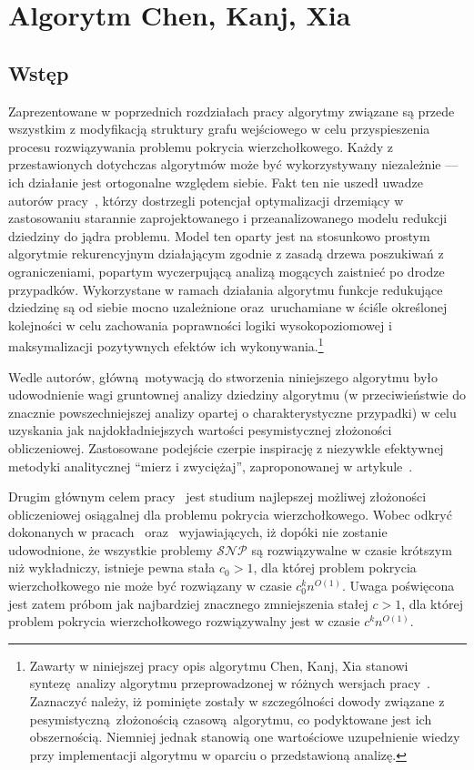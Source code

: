 \section{Algorytm Chen, Kanj, Xia}\label{s_ckx}
\subsection{Wstęp}
\par{
  Zaprezentowane w poprzednich rozdziałach pracy algorytmy związane są przede wszystkim z modyfikacją struktury grafu wejściowego w celu przyspieszenia procesu rozwiązywania problemu pokrycia wierzchołkowego.
  Każdy z przestawionych dotychczas algorytmów może być wykorzystywany niezależnie --- ich działanie jest ortogonalne względem siebie.
  Fakt ten nie uszedł uwadze autorów pracy~\cite{ImprovedBounds10}, którzy dostrzegli potencjał optymalizacji drzemiący w zastosowaniu starannie zaprojektowanego i przeanalizowanego modelu redukcji dziedziny do jądra problemu.
  Model ten oparty jest na stosunkowo prostym algorytmie rekurencyjnym działającym zgodnie z zasadą drzewa poszukiwań z ograniczeniami, popartym wyczerpującą analizą mogących zaistnieć po drodze przypadków.
  Wykorzystane w ramach działania algorytmu funkcje redukujące dziedzinę są od siebie mocno uzależnione oraz uruchamiane w ściśle określonej kolejności w celu zachowania poprawności logiki wysokopoziomowej i maksymalizacji pozytywnych efektów ich wykonywania.\footnote{Zawarty w niniejszej pracy opis algorytmu Chen, Kanj, Xia stanowi syntezę analizy algorytmu przeprowadzonej w różnych wersjach pracy~\cite{ImprovedBounds10}. Zaznaczyć należy, iż pominięte zostały w szczególności dowody związane z pesymistyczną złożonością czasową algorytmu, co podyktowane jest ich obszernością. Niemniej jednak stanowią one wartościowe uzupełnienie wiedzy przy implementacji algorytmu w oparciu o przedstawioną analizę.}
}
\par{
  Wedle autorów, główną motywacją do stworzenia niniejszego algorytmu było udowodnienie wagi gruntownej analizy dziedziny algorytmu (w przeciwieństwie do znacznie powszechniejszej analizy opartej o charakterystyczne przypadki) w celu uzyskania jak najdokładniejszych wartości pesymistycznej złożoności obliczeniowej.
  Zastosowane podejście czerpie inspirację z niezywkle efektywnej metodyki analitycznej ``mierz i zwyciężaj'', zaproponowanej w artykule~\cite{conf/icalp/FominGK05}.

  Drugim głównym celem pracy~\cite{ImprovedBounds10} jest studium najlepszej możliwej złożoności obliczeniowej osiągalnej dla problemu pokrycia wierzchołkowego.
  Wobec odkryć dokonanych w pracach~\cite{Impagliazzo2001512} oraz~\cite{Cai2003789} wyjawiających, iż dopóki nie zostanie udowodnione, że wszystkie problemy $\mathcal{SNP}$ są rozwiązywalne w czasie krótszym niż wykładniczy, istnieje pewna stała $c_0 > 1$, dla której problem pokrycia wierzchołkowego nie może być rozwiązany w czasie $c_0^kn^{O(1)}$.
  Uwaga poświęcona jest zatem próbom jak najbardziej znacznego zmniejszenia stałej $c > 1$, dla której problem pokrycia wierzchołkowego rozwiązywalny jest w czasie $c^kn^{O(1)}$.
}
